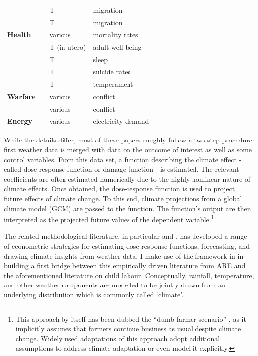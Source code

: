 \documentclass[a4paper,12pt]{article}
\theoremstyle{plain}
\theoremstyle{definition}
\theoremstyle{definition}
\theoremstyle{definition}
\theoremstyle{definition}
\begin{document}
\begin{table}[H]
\begin{tabular}{|p{2.8cm}|p{6cm}|p{2.2cm}|p{3.5cm}| }
    \ \ & \citet{Cattaneo2016}& T & migration\\
    \ \ & \citet{Missirian2017}& T & migration\\    
    \hline
    \textbf{Health} & \citet{Deschenes2014} & various & mortality rates\\
    \ \ & \citet{Isen2017} & T (in utero) & adult well being\\
    \ \ & \citet{Obradovich2017} & T & sleep\\
    \ \ & \citet{Burke2018} & T & suicide rates\\
    \ \ & \citet{Baylis2020} & T & temperament\\
    \hline
    \textbf{Warfare} & \citet{Hsiang2011} & various & conflict\\
    \ \ & \citet{Burke2015} & various & conflict\\
    \hline
    \textbf{Energy} & \citet{Auffhammer2014} & various & electricity demand\\
    \hline
    \end{tabular}
    \label{tab:ARE_lit}
\end{table}

While the details differ, most of these papers roughly follow a two step procedure: first weather data is merged with data on the outcome of interest as well as some control variables. From this data set, a function describing the climate effect - called dose-response function or damage function - is estimated. The relevant coefficients are often estimated numerically due to the highly nonlinear nature of climate effects. Once obtained, the dose-response function is used to project future effects of climate change. To this end, climate projections from a global climate model (GCM) are passed to the function. The function's output are then interpreted as the projected future values of the dependent variable.\footnote{This approach by itself has been dubbed the ``dumb farmer scenario'' \citep{Auffhammer2014a}, as it implicitly assumes that farmers continue business as usual despite climate change. Widely used adaptations of this approach adopt additional assumptions to address climate adaptation or even model it explicitly.}

The related methodological literature, in particular \citet{Timmins2009, Schlenker2010a, Auffhammer2013, Hansen2014, Auffhammer2018} and \citet{Hsiang2016a}, has developed a range of econometric strategies for estimating dose response functions, forecasting, and drawing climate insights from weather data. I make use of the framework in \citet{Hsiang2016a} in building a first bridge between this empirically driven literature from ARE and the aforementioned literature on child labour. Conceptually, rainfall, temperature, and other weather components are modelled to be jointly drawn from an underlying distribution which is commonly called `climate'. 
\end{document}
